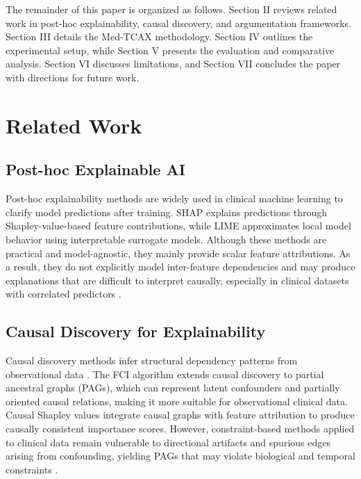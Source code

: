 \documentclass[conference, a4paper]{IEEEtran}
\begin{document}
The remainder of this paper is organized as follows. Section II reviews related work in post-hoc explainability, causal discovery, and argumentation frameworks. Section III details the Med-TCAX methodology. Section IV outlines the experimental setup, while Section V presents the evaluation and comparative analysis. Section VI discusses limitations, and Section VII concludes the paper with directions for future work.

\section{Related Work}

\subsection{Post-hoc Explainable AI}
Post-hoc explainability methods are widely used in clinical machine learning to clarify model predictions after training. SHAP \cite{ref3} explains predictions through Shapley-value-based feature contributions, while LIME \cite{ref4} approximates local model behavior using interpretable surrogate models. Although these methods are practical and model-agnostic, they mainly provide scalar feature attributions. As a result, they do not explicitly model inter-feature dependencies and may produce explanations that are difficult to interpret causally, especially in clinical datasets with correlated predictors \cite{ref5}.

\subsection{Causal Discovery for Explainability}
Causal discovery methods infer structural dependency patterns from observational data \cite{ref12}. The FCI algorithm \cite{ref13} extends causal discovery to partial ancestral graphs (PAGs), which can represent latent confounders and partially oriented causal relations, making it more suitable for observational clinical data. Causal Shapley values \cite{ref15} integrate causal graphs with feature attribution to produce causally consistent importance scores. However, constraint-based methods applied to clinical data remain vulnerable to directional artifacts and spurious edges arising from confounding, yielding PAGs that may violate biological and temporal constraints \cite{ref7}.
\end{document}
